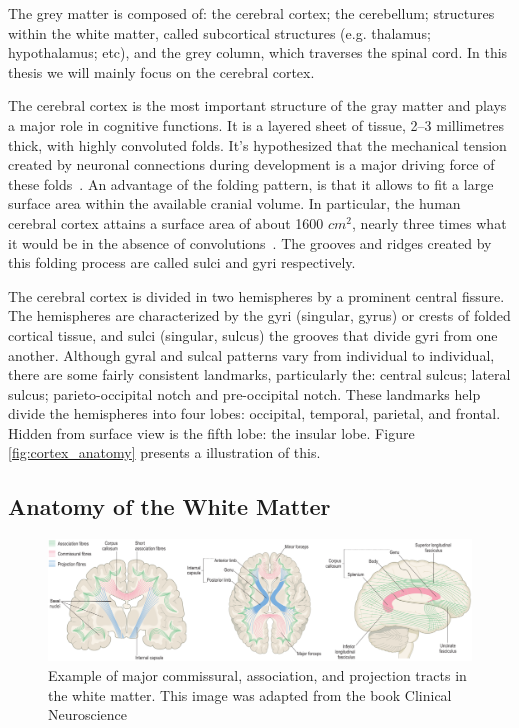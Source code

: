 The grey matter is composed of: the cerebral cortex; the cerebellum; structures
within the white matter, called subcortical structures (e.g. thalamus; hypothalamus; etc),
and the grey column, which traverses the spinal cord. In this thesis we will
mainly focus on the cerebral cortex.

The cerebral cortex is the most important structure of the gray matter and
plays a major role in cognitive functions. It is a layered sheet of tissue,
2–3 millimetres thick, with highly convoluted folds. It's hypothesized that the
mechanical tension created by neuronal connections during development is a major
driving force of these folds~\cite{VanEssen1997}. An advantage of the folding
pattern, is that it allows to fit a large surface area within the available
cranial volume. In particular, the human cerebral cortex attains a surface area
of about 1600 $cm^2$, nearly three times what it would be in the absence of
convolutions~\cite{VanEssen1997}. The grooves and ridges created by this folding
process are called sulci and gyri respectively.

The cerebral cortex is divided in two hemispheres by a prominent central fissure.
The hemispheres are characterized by the gyri (singular, gyrus) or crests of
folded cortical tissue, and sulci (singular, sulcus) the grooves that divide
gyri from one another. Although gyral and sulcal patterns vary from individual
to individual, there are some fairly consistent landmarks, particularly the: 
central sulcus; lateral sulcus; parieto-occipital notch and pre-occipital notch.
These landmarks help divide the hemispheres into four lobes: occipital, 
temporal, parietal, and frontal. Hidden from surface view is the fifth lobe:
the insular lobe. Figure \ref{fig:cortex_anatomy} presents a illustration of this.

\subsection{Anatomy of the White Matter}

\begin{figure}[t]
    \includegraphics[width=\textwidth]{2.neuroanatomy/img/tracts.png}
    \caption{Example of major commissural, association, and projection tracts
             in the white matter. This image was adapted from the book Clinical
             Neuroscience~\cite{Johns}}
    \label{fig:white_anatomy}
\end{figure}

